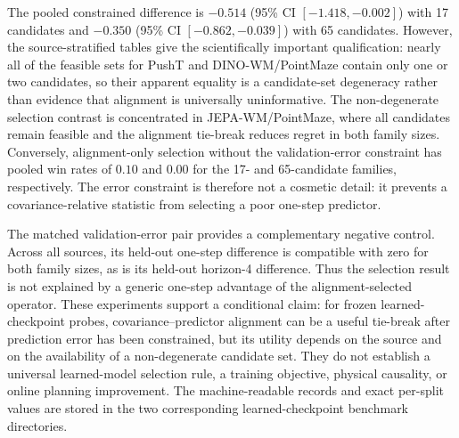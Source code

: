 \documentclass{article}
\begin{document}
\begin{table}[H]
\centering
\scriptsize
\setlength{\tabcolsep}{3pt}
\caption{Sensitivity to a larger 65-candidate spectrum-preserving family.
The estimand and split protocol are identical to Table~\ref{tab:supp-learned-selection-17};
the difference column is constrained alignment regret minus spectrum-only
regret, so negative values favor alignment.}
\label{tab:supp-learned-selection-65}
\end{table}

The pooled constrained difference is $-0.514$ (95\% CI
$[-1.418,-0.002]$) with 17 candidates and $-0.350$ (95\% CI
$[-0.862,-0.039]$) with 65 candidates. However, the source-stratified
tables give the scientifically important qualification: nearly all of the
feasible sets for PushT and DINO-WM/PointMaze contain only one or two
candidates, so their apparent equality is a candidate-set degeneracy rather
than evidence that alignment is universally uninformative. The non-degenerate
selection contrast is concentrated in JEPA-WM/PointMaze, where all candidates
remain feasible and the alignment tie-break reduces regret in both family
sizes. Conversely, alignment-only selection without the validation-error
constraint has pooled win rates of $0.10$ and $0.00$ for the 17- and
65-candidate families, respectively. The error constraint is therefore not a
cosmetic detail: it prevents a covariance-relative statistic from selecting a
poor one-step predictor.

The matched validation-error pair provides a complementary negative control.
Across all sources, its held-out one-step difference is compatible with zero
for both family sizes, as is its held-out horizon-4 difference. Thus the
selection result is not explained by a generic one-step advantage of the
alignment-selected operator. These experiments support a conditional claim:
for frozen learned-checkpoint probes, covariance--predictor alignment can be a
useful tie-break after prediction error has been constrained, but its utility
depends on the source and on the availability of a non-degenerate candidate
set. They do not establish a universal learned-model selection rule, a
training objective, physical causality, or online planning improvement. The
machine-readable records and exact per-split values are stored in the two
corresponding learned-checkpoint benchmark directories.
\end{document}
